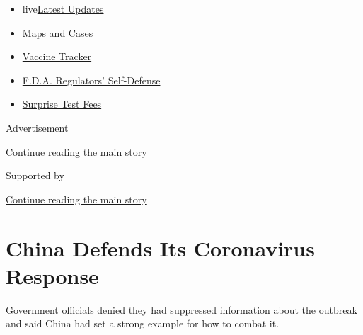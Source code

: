 \begin{itemize}
\tightlist
\item
  live\href{https://www.nytimes3xbfgragh.onion/2020/09/11/world/covid-19-coronavirus.html?name=styln-coronavirus-national\&region=TOP_BANNER\&block=storyline_menu_recirc\&action=click\&pgtype=Article\&impression_id=f5a8ea40-f4b4-11ea-8fdc-a33712551175\&variant=undefined}{Latest
  Updates}
\item
  \href{https://www.nytimes3xbfgragh.onion/interactive/2020/us/coronavirus-us-cases.html?name=styln-coronavirus-national\&region=TOP_BANNER\&block=storyline_menu_recirc\&action=click\&pgtype=Article\&impression_id=f5a8ea41-f4b4-11ea-8fdc-a33712551175\&variant=undefined}{Maps
  and Cases}
\item
  \href{https://www.nytimes3xbfgragh.onion/interactive/2020/science/coronavirus-vaccine-tracker.html?name=styln-coronavirus-national\&region=TOP_BANNER\&block=storyline_menu_recirc\&action=click\&pgtype=Article\&impression_id=f5a8ea42-f4b4-11ea-8fdc-a33712551175\&variant=undefined}{Vaccine
  Tracker}
\item
  \href{https://www.nytimes3xbfgragh.onion/2020/09/10/us/politics/fda-coronavirus-vaccine.html?name=styln-coronavirus-national\&region=TOP_BANNER\&block=storyline_menu_recirc\&action=click\&pgtype=Article\&impression_id=f5a8ea43-f4b4-11ea-8fdc-a33712551175\&variant=undefined}{F.D.A.
  Regulators' Self-Defense}
\item
  \href{https://www.nytimes3xbfgragh.onion/2020/09/09/upshot/coronavirus-surprise-test-fees.html?name=styln-coronavirus-national\&region=TOP_BANNER\&block=storyline_menu_recirc\&action=click\&pgtype=Article\&impression_id=f5a8ea44-f4b4-11ea-8fdc-a33712551175\&variant=undefined}{Surprise
  Test Fees}
\end{itemize}

Advertisement

\protect\hyperlink{after-top}{Continue reading the main story}

Supported by

\protect\hyperlink{after-sponsor}{Continue reading the main story}

\hypertarget{china-defends-its-coronavirus-response}{%
\section{China Defends Its Coronavirus
Response}\label{china-defends-its-coronavirus-response}}

Government officials denied they had suppressed information about the
outbreak and said China had set a strong example for how to combat it.

